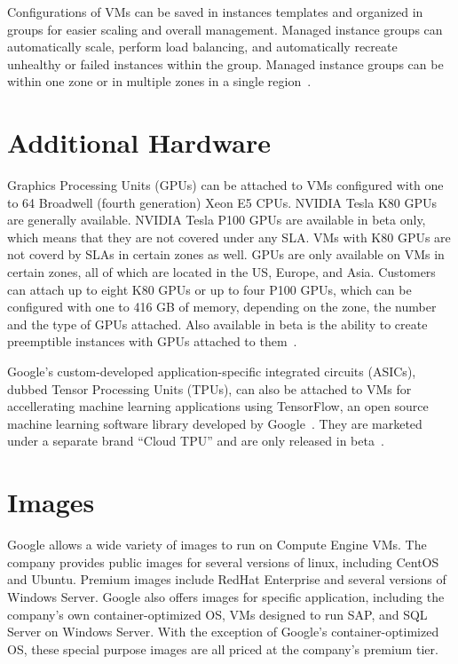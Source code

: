 Configurations of VMs can be saved in instances templates and
organized in groups for easier scaling and overall management. Managed
instance groups can automatically scale, perform load balancing, and
automatically recreate unhealthy or failed instances within the
group. Managed instance groups can be within one zone or in multiple
zones in a single region~\cite{hid-sp18-419-gce-instance-groups}.

\section{Additional Hardware}

Graphics Processing Units (GPUs) can be attached to VMs configured
with one to 64 Broadwell (fourth generation) Xeon E5 CPUs. NVIDIA
Tesla K80 GPUs are generally available. NVIDIA Tesla P100 GPUs are
available in beta only, which means that they are not covered under
any SLA. VMs with K80 GPUs are not coverd by SLAs in certain zones as
well. GPUs are only available on VMs in certain zones, all of which
are located in the US, Europe, and Asia. Customers can attach up to
eight K80 GPUs or up to four P100 GPUs, which can be configured with
one to 416 GB of memory, depending on the zone, the number and the
type of GPUs attached. Also available in beta is the ability to create
preemptible instances with GPUs attached to
them~\cite{hid-sp18-419-gce-gpus}.

Google's custom-developed application-specific integrated circuits
(ASICs), dubbed Tensor Processing Units (TPUs), can also be attached
to VMs for accellerating machine learning applications using
TensorFlow, an open source machine learning software library developed
by Google~\cite{hid-sp18-419-tensorflow}. They are marketed under a
separate brand ``Cloud TPU'' and are only released in
beta~\cite{hid-sp18-419-cloud-tpu}.

\section{Images}
Google allows a wide variety of images to run on Compute Engine
VMs. The company provides public images for several versions of linux,
including CentOS and Ubuntu. Premium images include RedHat Enterprise
and several versions of Windows Server. Google also offers images for
specific application, including the company's own container-optimized
OS, VMs designed to run SAP, and SQL Server on Windows Server. With
the exception of Google's container-optimized OS, these special
purpose images are all priced at the company's premium tier.

